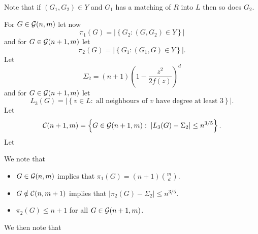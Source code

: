\documentclass[11pt]{article}
\newcommand{\card}[1]{\left|#1\right|}
\def\p{\pi}
\def\S{\Sigma}
\newcommand{\set}[1]{\left\{#1\right\}}
\def\cC{{\cal C}}
\def\cG{{\cal G}}
\newcommand{\brac}[1]{\left(#1\right)}
\begin{document}
Note that if $(G_1,G_2)\in Y$ and $G_1$ has a matching of $R$ into $L$ then so does $G_2$.

For $G\in \cG(n,m)$ let now
$$\p_1(G)=|\set{G_2:(G,G_2)\in Y}|$$
and for $G\in \cG(n+1,m)$ let
$$\p_2(G)=|\set{G_1:(G_1,G)\in Y}|.$$
Let
$$\S_2=(n+1)\brac{1-\frac{z^2}{2f(z)}}^d$$ 
and for $G\in \cG(n+1,m)$ let
$$L_3(G)=\card{\set{v\in L:\;\text{all neighbours of $v$ have degree at least 3}}}.$$
Let 
$$\cC(n+1,m)=\set{G\in \cG(n+1,m):\;|L_3(G)-\S_2|\leq n^{3/5}}.$$
Let 

We note that
\begin{itemize}
\item $G\in \cG(n,m)$ implies that $\p_1(G)=(n+1)\binom{m}{d}$.
\item $G\notin \cC(n,m+1)$ implies that $\card{\p_2(G)-\S_2}\leq n^{3/5}$.
\item $\p_2(G)\leq n+1$ for all $G\in \cG(n+1,m)$.
\end{itemize}
We then note that
\end{document}
